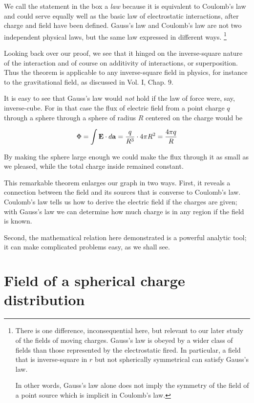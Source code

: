 We call the statement in the box a \emph{law} because it is
equivalent to Coulomb's law and could serve equally well as the basic
law of electrostatic interactions, after charge and field have been
defined. Gauss's law and Coulomb's law are not two independent
physical laws, but the same law expressed in different ways.
\footnote{There is one difference, inconsequential here, but relevant
to our later study of the fields of moving charges. Gauss's law is
obeyed by a wider class of fields than those represented by the
electrostatic fired. In particular, a field that is inverse-square in
$r$ but not spherically symmetrical can satisfy Gauss's law.

In other words, Gauss's law alone does not imply the symmetry of the
field of a point source which is implicit in Coulomb's law.}

Looking back over our proof, we see that it hinged on the
inverse-square nature of the interaction and of course on additivity
of interactions, or superposition. Thus the theorem is applicable to
any inverse-square field in physics, for instance to the
gravitational field, as discussed in Vol. I, Chap. $9$.

It is easy to see that Gauss's law would \emph{not} hold if the law
of force were, say, inverse-cube. For in that case the flux of
electric field 
from a point charge $q$ through a sphere
through a sphere of radius $R$ centered on the charge would be

\begin{equation} 
\Phi =  \mathbf{\int E} \cdot d \mathbf{a} = \frac{q}{R^3} \cdot 4 \pi R^2 =  \frac{4 \pi q}{R}
\end{equation}

By making the sphere large enough we could make the flux through it
as small as we pleased, while the total charge inside remained
constant.

This remarkable theorem enlarges our graph in two ways. First, it
reveals a connection between the field and its sources that is
converse to Coulomb's law. Coulomb's law tells us how to derive the
electric field if the charges are given; with Gauss's law we can
determine how much charge is in any region if the field is known.

Second, the mathematical relation here demonstrated is a powerful
analytic tool; it can make complicated problems easy, as we shall see.

\section{Field of a spherical charge distribution}


